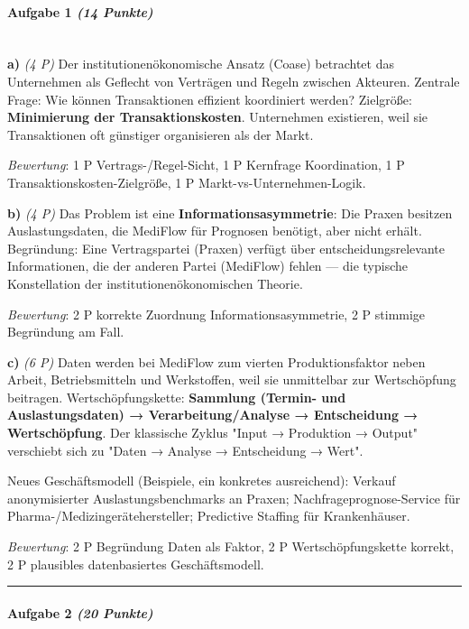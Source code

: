 \documentclass[11pt, a4paper]{article}
\begin{document}
\paragraph{Aufgabe 1 \textit{(14 Punkte)}}\mbox{}\\[2pt]

\textbf{a)} \textit{(4 P)} Der institutionenökonomische Ansatz (Coase) betrachtet das Unternehmen als Geflecht von Verträgen und Regeln zwischen Akteuren. Zentrale Frage: Wie können Transaktionen effizient koordiniert werden? Zielgröße: \textbf{Minimierung der Transaktionskosten}. Unternehmen existieren, weil sie Transaktionen oft günstiger organisieren als der Markt.

\textit{Bewertung}: 1 P Vertrags-/Regel-Sicht, 1 P Kernfrage Koordination, 1 P Transaktionskosten-Zielgröße, 1 P Markt-vs-Unternehmen-Logik.


\textbf{b)} \textit{(4 P)} Das Problem ist eine \textbf{Informationsasymmetrie}: Die Praxen besitzen Auslastungsdaten, die MediFlow für Prognosen benötigt, aber nicht erhält. Begründung: Eine Vertragspartei (Praxen) verfügt über entscheidungsrelevante Informationen, die der anderen Partei (MediFlow) fehlen — die typische Konstellation der institutionenökonomischen Theorie.

\textit{Bewertung}: 2 P korrekte Zuordnung Informationsasymmetrie, 2 P stimmige Begründung am Fall.


\textbf{c)} \textit{(6 P)} Daten werden bei MediFlow zum vierten Produktionsfaktor neben Arbeit, Betriebsmitteln und Werkstoffen, weil sie unmittelbar zur Wertschöpfung beitragen. Wertschöpfungskette: \textbf{Sammlung (Termin- und Auslastungsdaten) → Verarbeitung/Analyse → Entscheidung → Wertschöpfung}. Der klassische Zyklus "Input → Produktion → Output" verschiebt sich zu "Daten → Analyse → Entscheidung → Wert".

Neues Geschäftsmodell (Beispiele, ein konkretes ausreichend): Verkauf anonymisierter Auslastungsbenchmarks an Praxen; Nachfrageprognose-Service für Pharma-/Medizingerätehersteller; Predictive Staffing für Krankenhäuser.

\textit{Bewertung}: 2 P Begründung Daten als Faktor, 2 P Wertschöpfungskette korrekt, 2 P plausibles datenbasiertes Geschäftsmodell.



\noindent\textcolor{rulegray}{\rule{\linewidth}{0.4pt}}


\paragraph{Aufgabe 2 \textit{(20 Punkte)}}\mbox{}\\[2pt]
\end{document}
